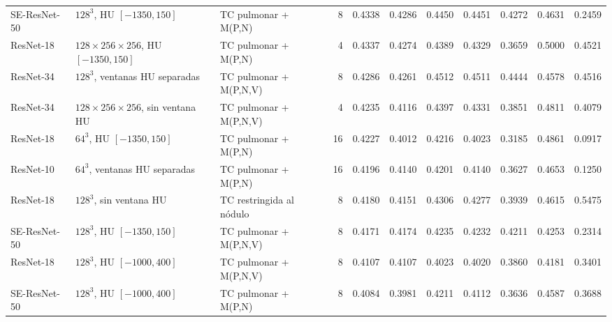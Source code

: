 \begin{table}[!htbp]
{\begin{tabular}{lllrccccccc}
SE-ResNet-50 & \(128^3\), HU \([-1350,150]\) & TC pulmonar + M(P,N) & 8 & 0.4338 & 0.4286 & 0.4450 & 0.4451 & 0.4272 & 0.4631 & 0.2459 \\
ResNet-18 &  \(128\times256\times256\), HU \([-1350,150]\) & TC pulmonar + M(P,N) & 4 & 0.4337 & 0.4274 & 0.4389 & 0.4329 & 0.3659 & 0.5000 & 0.4521 \\
ResNet-34 & \(128^3\), ventanas HU separadas & TC pulmonar + M(P,N,V) & 8 & 0.4286 & 0.4261 & 0.4512 & 0.4511 & 0.4444 & 0.4578 & 0.4516 \\
ResNet-34 &  \(128\times256\times256\), sin ventana HU & TC pulmonar + M(P,N,V) & 4 & 0.4235 & 0.4116 & 0.4397 & 0.4331 & 0.3851 & 0.4811 & 0.4079 \\
ResNet-18 & \(64^3\), HU \([-1350,150]\) & TC pulmonar + M(P,N) & 16 & 0.4227 & 0.4012 & 0.4216 & 0.4023 & 0.3185 & 0.4861 & 0.0917 \\
ResNet-10 & \(64^3\), ventanas HU separadas & TC pulmonar + M(P,N) & 16 & 0.4196 & 0.4140 & 0.4201 & 0.4140 & 0.3627 & 0.4653 & 0.1250 \\
ResNet-18 & \(128^3\), sin ventana HU & TC restringida al nódulo & 8 & 0.4180 & 0.4151 & 0.4306 & 0.4277 & 0.3939 & 0.4615 & 0.5475 \\
SE-ResNet-50 & \(128^3\), HU \([-1350,150]\) & TC pulmonar + M(P,N,V) & 8 & 0.4171 & 0.4174 & 0.4235 & 0.4232 & 0.4211 & 0.4253 & 0.2314 \\
ResNet-18 &  \(128^3\), HU \([-1000,400]\) & TC pulmonar + M(P,N,V) & 8 & 0.4107 & 0.4107 & 0.4023 & 0.4020 & 0.3860 & 0.4181 & 0.3401 \\
SE-ResNet-50 &  \(128^3\), HU \([-1000,400]\) & TC pulmonar + M(P,N) & 8 & 0.4084 & 0.3981 & 0.4211 & 0.4112 & 0.3636 & 0.4587 & 0.3688 \\
\bottomrule
\end{tabular}%
}
\end{table}




